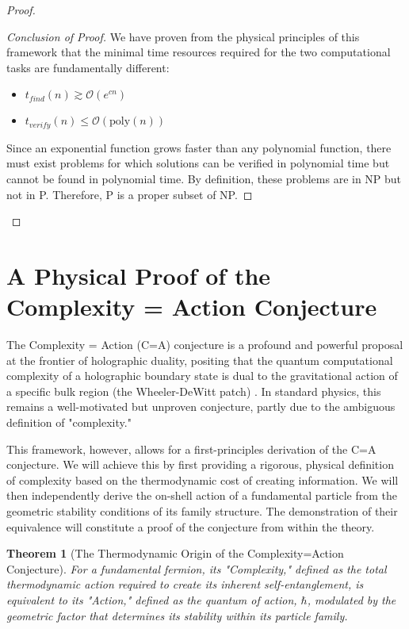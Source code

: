 \documentclass[11pt, letterpaper]{report}
\theoremstyle{plain} %
\newtheorem{theorem}{Theorem}[chapter]
\theoremstyle{definition} %
\theoremstyle{remark} %
\begin{document}
\begin{proof}
\begin{proof}[Conclusion of Proof] %
We have proven from the physical principles of this framework that the minimal time resources required for the two computational tasks are fundamentally different:
\begin{itemize}
    \item $t_{find}(n) \gtrsim \mathcal{O}(e^{cn})$
    \item $t_{verify}(n) \le \mathcal{O}(\text{poly}(n))$
\end{itemize}
Since an exponential function grows faster than any polynomial function, there must exist problems for which solutions can be verified in polynomial time but cannot be found in polynomial time. By definition, these problems are in NP but not in P. Therefore, P is a proper subset of NP.
\end{proof}
\end{proof} %







\section{A Physical Proof of the Complexity = Action Conjecture}
\label{sec:c_equals_a_proof}

The Complexity = Action (C=A) conjecture is a profound and powerful proposal at the frontier of holographic duality, positing that the quantum computational complexity of a holographic boundary state is dual to the gravitational action of a specific bulk region (the Wheeler-DeWitt patch) \cite{Brown2016CA}. In standard physics, this remains a well-motivated but unproven conjecture, partly due to the ambiguous definition of "complexity."

This framework, however, allows for a first-principles derivation of the C=A conjecture. We will achieve this by first providing a rigorous, physical definition of complexity based on the thermodynamic cost of creating information. We will then independently derive the on-shell action of a fundamental particle from the geometric stability conditions of its family structure. The demonstration of their equivalence will constitute a proof of the conjecture from within the theory.

\begin{theorem}[The Thermodynamic Origin of the Complexity=Action Conjecture]
\label{thm:c_equals_a_proof}
For a fundamental fermion, its "Complexity," defined as the total thermodynamic action required to create its inherent self-entanglement, is equivalent to its "Action," defined as the quantum of action, $\hbar$, modulated by the geometric factor that determines its stability within its particle family.
\end{theorem}
\end{document}
